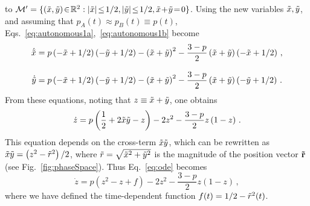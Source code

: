 \documentclass[review]{elsarticle}
\newcommand{\tx}{\Tilde{x}}
\newcommand{\ty}{\Tilde{y}}
\newcommand{\tr}{\Tilde{r}}
\newcommand{\LE}{\!\leq\!}
\newcommand{\EQ}{\!=\!}
\newcommand{\IN}{\!\in\!}
\newcommand{\+}{\! + \!}
\begin{document}
to
$\mathcal{M'} = \{ (\tx, \ty) \IN \mathbb{R}^2: |\tx| \LE 1/2,  |\ty| \LE 1/2, \tx \+ \ty \EQ 0 \}$.
% 
Using the new variables $\tx, \ty$, and assuming that $p_A(t) \approx p_B(t) \equiv p(t)$, Eqs.~\eqref{eq:autonomous1a},~\eqref{eq:autonomous1b} become
%
\begin{align}
    \dot{\tx}     & = p \left(- \tx + 1/2 \right) \left(- \ty + 1/2 \right) - \left(\tx + \ty \right)^{2} 
              - \frac{ 3 - p}{2} \left(\tx + \ty \right) \left(- \tx + 1/2  \right) \, , 
    \label{eq:autonomous2a} 
\\[2ex]
    \dot{\ty}     & =  p \left(- \tx + 1/2 \right) \left(- \ty + 1/2 \right) - \left(\tx + \ty \right)^{2} 
              - \frac{ 3 - p}{2} \left(\tx + \ty \right) \left(- \ty + 1/2  \right) \, . 
    \label{eq:autonomous2b}
\end{align}
%
From these equations, noting that $z \equiv \tx + \ty$, one obtains 
%
\begin{equation}\label{eq:ode}
   \dot{z} = p \left(\frac{1}{2} + 2 \tx \ty - z \right) - 2 z^{2}  - \frac{ 3 - p}{2} z \left(1 - z \right) \, .
\end{equation}
%
This equation depends on the cross-term $ \tx \ty$, which can be rewritten as $\tx \ty = \left(z^{2} -  \tr^{2}\right)/2$, where  $\tr= \sqrt{\tx^{2}  + \ty^{2}}$ is the magnitude of the position vector $\mathbf{\tr}$ (see Fig.~\ref{fig:phaseSpace}).
Thus Eq.~\eqref{eq:ode} becomes
%
\begin{equation}\label{eq:ode1}
    \dot{z} = p \left( z^{2} - z + f \right) - 2 z^{2}  - \frac{ 3 - p}{2} z \left(1 - z \right) \, ,
\end{equation}
%
where we have defined the time-dependent function $f(t) = 1/2 - \tr^{2}(t)$. 
\end{document}
